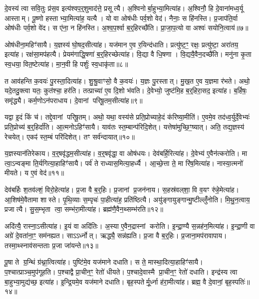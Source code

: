 दे॒वस्य॑ त्वा सवि॒तुः प्र॑स॒व इत्य॑श्वप॒र्॒शुमाद॑त्ते॒ प्रसूत्यै।
अ॒श्विनोर्बा॒हुभ्या॒मित्या॑ह।
अ॒श्विनौ॒ हि दे॒वाना॑मध्व॒र्यू आस्ताम्।
पू॒ष्णो हस्ताभ्या॒मित्या॑ह॒ यत्यै।
यो वा ओष॑धीः पर्व॒शो वेद॑।
नैनाः॒ स हि॑नस्ति।
प्र॒जाप॑ति॒र्वा ओष॑धीः पर्व॒शो वे॑द।
स ए॑ना॒ न हि॑नस्ति।
अ॒श्व॒प॒र्श्वा ब॒र्॒हिरच्छै॑ति।
प्रा॒जा॒प॒त्यो वा अश्वः॑ सयोनि॒त्वाय॑॥७॥

ओष॑धीना॒महिꣳ॑सायै।
य॒ज्ञस्य॑ घो॒षद॒सीत्या॑ह।
यज॑मान ए॒व र॒यिन्द॑धाति।
प्रत्यु॑ष्ट॒ꣳ॒ रक्षः॒ प्रत्यु॑ष्टा॒ अरा॑तय॒ इत्या॑ह।
रक्ष॑सा॒मप॑हत्यै।
प्रेयम॑गाद्धि॒षणा॑ ब॒र्॒हिरच्छेत्या॑ह।
वि॒द्या वै धि॒षणा।
वि॒द्ययै॒वैन॒दच्छै॑ति।
मनु॑ना कृ॒ता स्व॒धया॒ वित॒ष्टेत्या॑ह।
मा॒न॒वी हि पर्\mbox{}शुः॑ स्व॒धाकृ॑ता॥८॥

त आव॑हन्ति क॒वयः॑ पु॒रस्ता॒दित्या॑ह।
शु॒श्रु॒वाꣳसो॒ वै क॒वयः॑।
य॒ज्ञः पु॒रस्तात्।
मु॒ख॒त ए॒व य॒ज्ञमा र॑भते।
अथो॒ यदे॒तदु॒क्त्वा यतः॒ कुत॑श्चा॒ हर॑ति।
तत्प्राच्या॑ ए॒व दि॒शो भ॑वति।
दे॒वेभ्यो॒ जुष्ट॑मि॒ह ब॒र्॒हिरा॒सद॒ इत्या॑ह।
ब॒र्\mbox{}हिषः॒ समृ॑द्ध्यै।
कर्म॒णो\-ऽन॑पराधाय।
दे॒वानां परिषू॒तम॒सीत्या॑ह॥९॥

यद्वा इ॒दं किं च॑।
तद्दे॒वानां परिषू॒तम्।
अथो॒ यथा॒ वस्य॑से प्रति॒प्रोच्याहे॒दं क॑रिष्या॒मीति॑।
ए॒वमे॒व तद॑ध्व॒र्युर्दे॒वेभ्यः॑ प्रति॒प्रोच्य॑ ब॒र्॒हिर्दा॑ति।
आ॒त्मनो\-ऽहिꣳ॑सायै।
याव॑तः स्त॒म्बान्प॑रिदि॒शेत्।
यत्तेषा॑मुच्छि॒ꣳ॒ष्यात्।
अति॒ तद्य॒ज्ञस्य॑ रेचयेत्।
एकꣴ॑ स्त॒म्बं परि॑दिशेत्।
तꣳ सर्व॑न्दायात्॥१०॥

य॒ज्ञस्यान॑तिरेकाय।
व॒र्॒षवृ॑द्धम॒सीत्या॑ह।
व॒र्॒षवृ॑द्धा॒ वा ओष॑धयः।
देव॑बर्\mbox{}हि॒रित्या॑ह।
दे॒वेभ्य॑ ए॒वैन॑त्करोति।
मा त्वा॒\-ऽन्वङ्मा ति॒र्यगित्या॒हाहिꣳ॑सायै।
पर्व॑ ते राध्यास॒मित्या॒हर्ध्यै।
आ॒च्छे॒त्ता ते॒ मा रि॑ष॒मित्या॑ह।
नास्या॒त्मनो॑ मीयते।
य ए॒वं वेद॑॥११॥

देव॑बर्\mbox{}हिः श॒तव॑ल्\mbox{}शं॒ विरो॒हेत्या॑ह।
प्र॒जा वै ब॒र्॒हिः।
प्र॒जानां प्र॒जन॑नाय।
स॒हस्र॑वल्‌शा॒ वि व॒यꣳ रु॑हे॒मेत्या॑ह।
आ॒शिष॑मे॒वैतामा शास्ते।
पृ॒थि॒व्याः स॒म्पृचः॑ पा॒हीत्या॑ह॒ प्रति॑ष्ठित्यै।
अयु॑ङ्गायुङ्गान्मु॒ष्टील्लुँ॑नोति।
मि॒थु॒न॒त्वाय॒ प्रजात्यै।
सु॒स॒म्भृता त्वा॒ सम्भ॑रा॒मीत्या॑ह।
ब्रह्म॑णै॒वैन॒थ्सम्भ॑रति॥१२॥

अदि॑त्यै॒ रास्ना॒\-ऽसीत्या॑ह।
इ॒यं वा अदि॑तिः।
अ॒स्या ए॒वैन॒द्रास्नां करोति।
इ॒न्द्रा॒ण्यै स॒न्नह॑न॒मित्या॑ह।
इ॒न्द्रा॒णी वा अग्रे॑ दे॒वता॑ना॒ꣳ॒ सम॑नह्यत।
साऽऽर्ध्नोत्।
ऋद्ध्यै॒ सन्न॑ह्यति।
प्र॒जा वै ब॒र्॒हिः।
प्र॒जाना॒मप॑रावापाय।
तस्मा॒थ्स्नाव॑सन्तताः प्र॒जा जा॑यन्ते॥१३॥

पू॒षा ते ग्र॒न्थिं ग्र॑थ्ना॒त्वित्या॑ह।
पुष्टि॑मे॒व यज॑माने दधाति।
स ते॒ मास्था॒दित्या॒हाहिꣳ॑सायै।
प॒श्चात्प्राञ्च॒मुप॑गूहति।
प॒श्चाद्वै प्रा॒चीन॒ꣳ॒ रेतो॑ धीयते।
प॒श्चादे॒वास्मै प्रा॒चीन॒ꣳ॒ रेतो॑ दधाति।
इन्द्र॑स्य त्वा बा॒हुभ्या॒मुद्य॑च्छ॒ इत्या॑ह।
इ॒न्द्रि॒यमे॒व यज॑माने दधाति।
बृह॒स्पतेर्मू॒र्ध्ना ह॑रा॒मीत्या॑ह।
ब्रह्म॒ वै दे॒वानां॒ बृह॒स्पतिः॑॥१४॥

